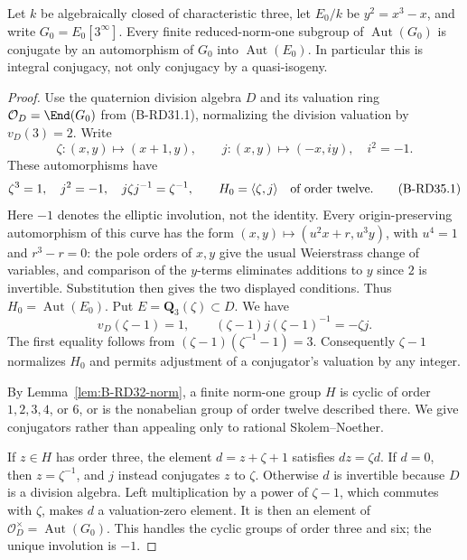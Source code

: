 \begin{lemma}
\label{lem:B-RD35-conjugacy}
Let $k$ be algebraically closed of characteristic three, let
$E_0/k$ be $y^2=x^3-x$, and write $G_0=E_0[3^\infty]$.
Every finite reduced-norm-one subgroup of $\operatorname{Aut}(G_0)$
is conjugate by an automorphism of $G_0$ into
$\operatorname{Aut}(E_0)$. In particular this is integral conjugacy,
not only conjugacy by a quasi-isogeny.
\end{lemma}
\begin{proof}
Use the quaternion division algebra $D$ and its valuation ring
$\mathcal O_D=\End(G_0)$ from (B-RD31.1), normalizing the division
valuation by $v_D(3)=2$. Write
\[
 \zeta:(x,y)\longmapsto(x+1,y),\qquad
 j:(x,y)\longmapsto(-x,iy),\quad i^2=-1.
\]
These automorphisms have
\[
 \zeta^3=1,\quad j^2=-1,\quad
 j\zeta j^{-1}=\zeta^{-1},\qquad
 H_0=\langle\zeta,j\rangle\quad\hbox{of order twelve}.
                                                        \tag{B-RD35.1}
\]
Here $-1$ denotes the elliptic involution, not the identity.
Every origin-preserving automorphism of this curve has the form
$(x,y)\mapsto(u^2x+r,u^3y)$, with $u^4=1$ and $r^3-r=0$:
the pole orders of $x,y$ give the usual Weierstrass change of
variables, and comparison of the $y$-terms eliminates additions
to $y$ since $2$ is invertible. Substitution then gives the two
displayed conditions. Thus $H_0=\operatorname{Aut}(E_0)$.
Put $E=\mathbf Q_3(\zeta)\subset D$. We have
\[
 v_D(\zeta-1)=1,\qquad
 (\zeta-1)j(\zeta-1)^{-1}=-\zeta j.
                                                        \tag{B-RD35.2}
\]
The first equality follows from
$(\zeta-1)(\zeta^{-1}-1)=3$. Consequently $\zeta-1$
normalizes $H_0$ and permits adjustment of a conjugator's valuation
by any integer.

By Lemma~\ref{lem:B-RD32-norm}, a finite norm-one group $H$ is
cyclic of order $1,2,3,4$, or $6$, or is the nonabelian group of
order twelve described there. We give conjugators rather than
appealing only to rational Skolem--Noether.

If $z\in H$ has order three, the element $d=z+\zeta+1$
satisfies $dz=\zeta d$. If $d=0$, then $z=\zeta^{-1}$,
and $j$ instead conjugates $z$ to $\zeta$. Otherwise $d$ is
invertible because $D$ is a division algebra. Left multiplication
by a power of $\zeta-1$, which commutes with $\zeta$, makes $d$
a valuation-zero element. It is then an element of
$\mathcal O_D^\times=\operatorname{Aut}(G_0)$.
This handles the cyclic groups of order three and six; the unique
involution is $-1$.


\end{proof}
